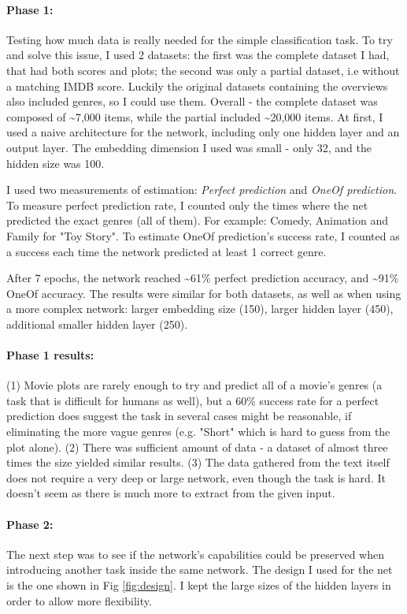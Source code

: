 \documentclass[11pt]{article}
\begin{document}
\paragraph{Phase 1:}
Testing how much data is really needed for the simple classification task.
To try and solve this issue, I used 2 datasets: the first was the complete dataset I had, that had both scores and plots; the second was only a partial dataset, i.e without a matching IMDB score. Luckily the original datasets containing the overviews also included genres, so I could use them.
Overall - the complete dataset was composed of \textasciitilde{7,000} items, while the partial included \textasciitilde{20,000} items.
At first, I used a naive architecture for the network, including only one hidden layer and an output layer.
The embedding dimension I used was small - only 32, and the hidden size was 100.

I used two measurements of estimation: \textit{Perfect prediction} and \textit{OneOf prediction}.
To measure perfect prediction rate, I counted only the times where the net predicted the exact genres (all of them). For example: Comedy, Animation and Family for "Toy Story".
To estimate OneOf prediction's success rate, I counted as a success each time the network predicted at least 1 correct genre.

After 7 epochs, the network reached \textasciitilde{61\%} perfect prediction accuracy, and \textasciitilde{91\%} OneOf accuracy.
The results were similar for both datasets, as well as when using a more complex network: larger embedding size (150), larger hidden layer (450), additional smaller hidden layer (250). 

\paragraph{Phase 1 results:}
(1) Movie plots are rarely enough to try and predict all of a movie's genres (a task that is difficult for humans as well), but a 60\% success rate for a perfect prediction does suggest the task in several cases might be reasonable, if eliminating the more vague genres (e.g. "Short" which is hard to guess from the plot alone).
(2) There was sufficient amount of data - a dataset of almost three times the size yielded similar results. 
(3) The data gathered from the text itself does not require a very deep or large network, even though the task is hard. It doesn't seem as there is much more to extract from the given input.

\paragraph{Phase 2:}
The next step was to see if the network's capabilities could be preserved when introducing another task inside the same network.
The design I used for the net is the one shown in Fig \ref{fig:design}. I kept the large sizes of the hidden layers in order to allow more flexibility.
\end{document}
